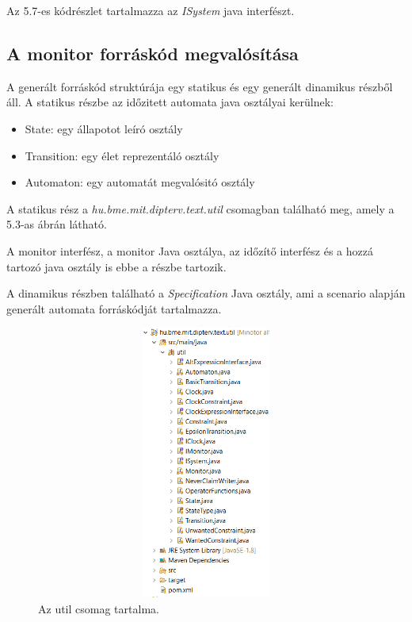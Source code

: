 Az 5.7-es kódrészlet tartalmazza az \textit{ISystem} java interfészt.

\subsection{A monitor forráskód megvalósítása}
A generált forráskód struktúrája egy statikus és egy generált dinamikus részből áll.
A statikus részbe az időzitett automata java osztályai kerülnek:
\begin{itemize}
    \item State: egy állapotot leíró osztály
    \item Transition: egy élet reprezentáló osztály
    \item Automaton: egy automatát megvalósitó osztály
\end{itemize}
A statikus rész a \textit{hu.bme.mit.dipterv.text.util} csomagban található meg, amely a 5.3-as ábrán látható.

A monitor interfész, a monitor Java osztálya, az időzítő interfész és a hozzá tartozó java osztály is ebbe a részbe tartozik.

A dinamikus részben található a \textit{Specification} Java osztály, ami a scenario alapján generált automata forráskódját tartalmazza.

\begin{figure}[!ht]
    \centering
    \includegraphics[width=150mm, height= 9cm, keepaspectratio]{figures/util_csomag.png}
    \caption{Az util csomag tartalma.}
\end{figure}

